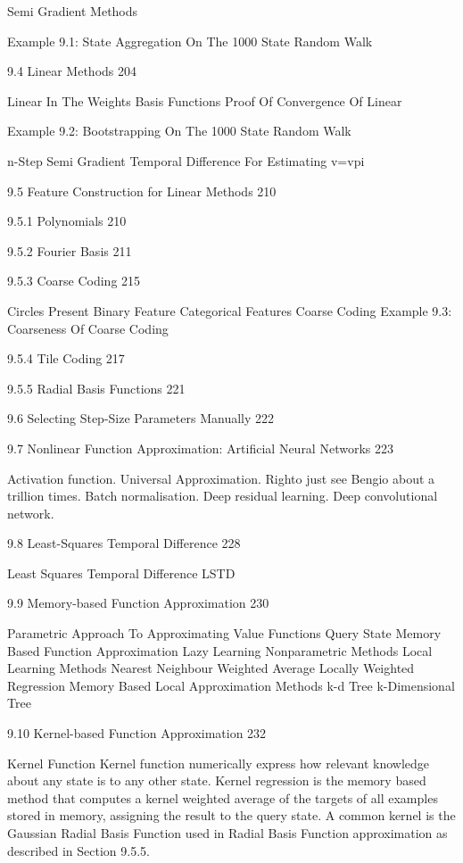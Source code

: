 Semi Gradient Methods

Example 9.1: State Aggregation On The 1000 State Random Walk

9.4 Linear Methods 204

Linear In The Weights
Basis Functions
Proof Of Convergence Of Linear

Example 9.2: Bootstrapping On The 1000 State Random Walk

n-Step Semi Gradient Temporal Difference For Estimating v=vpi

9.5 Feature Construction for Linear Methods 210



9.5.1 Polynomials 210



9.5.2 Fourier Basis 211



9.5.3 Coarse Coding 215

Circles
Present
Binary Feature
Categorical Features
Coarse Coding
Example 9.3: Coarseness Of Coarse Coding

9.5.4 Tile Coding 217



9.5.5 Radial Basis Functions 221



9.6 Selecting Step-Size Parameters Manually 222



9.7 Nonlinear Function Approximation: Artificial Neural Networks 223

Activation function.
Universal Approximation.
Righto just see Bengio about a trillion times.
Batch normalisation.
Deep residual learning.
Deep convolutional network.

9.8 Least-Squares Temporal Difference 228

Least Squares Temporal Difference LSTD

9.9 Memory-based Function Approximation 230

Parametric Approach To Approximating Value Functions
Query State
Memory Based Function Approximation
Lazy Learning
Nonparametric Methods
Local Learning Methods
Nearest Neighbour
Weighted Average
Locally Weighted Regression
Memory Based Local Approximation Methods
k-d Tree k-Dimensional Tree

9.10 Kernel-based Function Approximation 232

Kernel Function
Kernel function numerically express how relevant knowledge about any state is to any other state.
Kernel regression is the memory based method that computes a kernel weighted average of the targets of all examples stored in memory, assigning the result to the query state.
A common kernel is the Gaussian Radial Basis Function used in Radial Basis Function approximation as described in Section 9.5.5.

